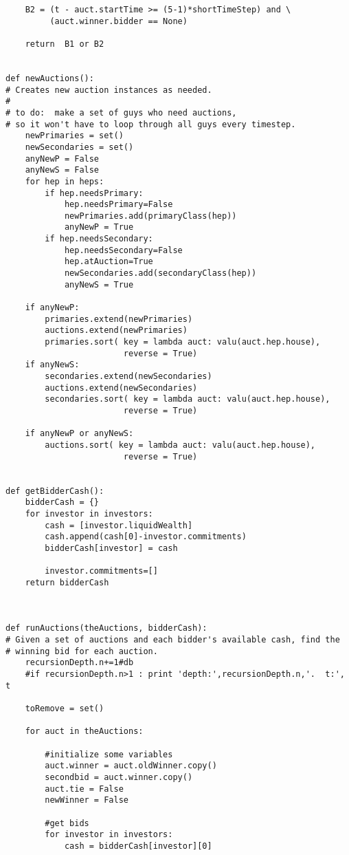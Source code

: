 \begin{lstlisting}
    B2 = (t - auct.startTime >= (5-1)*shortTimeStep) and \
         (auct.winner.bidder == None)
    
    return  B1 or B2


def newAuctions():
# Creates new auction instances as needed.
#
# to do:  make a set of guys who need auctions,
# so it won't have to loop through all guys every timestep.
    newPrimaries = set()
    newSecondaries = set()
    anyNewP = False
    anyNewS = False
    for hep in heps:
        if hep.needsPrimary:
            hep.needsPrimary=False
            newPrimaries.add(primaryClass(hep))
            anyNewP = True
        if hep.needsSecondary:
            hep.needsSecondary=False
            hep.atAuction=True
            newSecondaries.add(secondaryClass(hep))
            anyNewS = True

    if anyNewP:
        primaries.extend(newPrimaries)
        auctions.extend(newPrimaries)
        primaries.sort( key = lambda auct: valu(auct.hep.house),
                        reverse = True)
    if anyNewS:
        secondaries.extend(newSecondaries)
        auctions.extend(newSecondaries)
        secondaries.sort( key = lambda auct: valu(auct.hep.house),
                        reverse = True)

    if anyNewP or anyNewS:
        auctions.sort( key = lambda auct: valu(auct.hep.house),
                        reverse = True)


def getBidderCash():
    bidderCash = {}
    for investor in investors:
        cash = [investor.liquidWealth]
        cash.append(cash[0]-investor.commitments)
        bidderCash[investor] = cash

        investor.commitments=[]
    return bidderCash
        


def runAuctions(theAuctions, bidderCash):
# Given a set of auctions and each bidder's available cash, find the
# winning bid for each auction.
    recursionDepth.n+=1#db
    #if recursionDepth.n>1 : print 'depth:',recursionDepth.n,'.  t:', t
    
    toRemove = set()
        
    for auct in theAuctions:

        #initialize some variables
        auct.winner = auct.oldWinner.copy()
        secondbid = auct.winner.copy()
        auct.tie = False
        newWinner = False

        #get bids
        for investor in investors:
            cash = bidderCash[investor][0]


\end{lstlisting}
